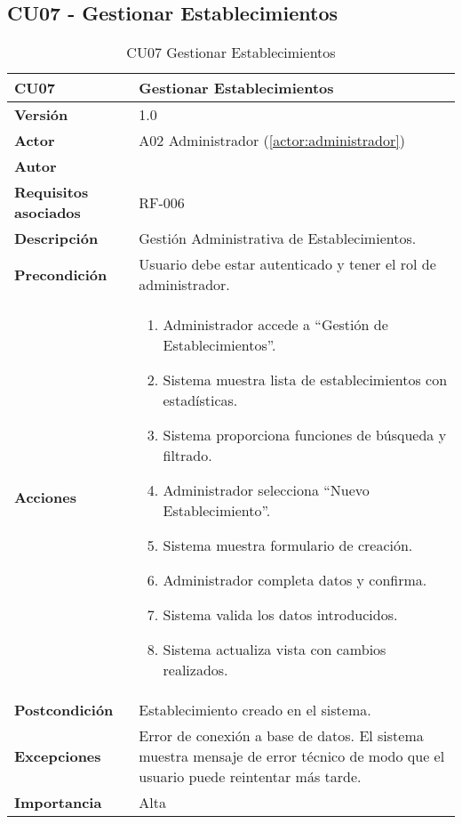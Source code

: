 \subsection{CU07 - Gestionar Establecimientos}

\begin{table}[H]
	\centering
	\begin{tabularx}{\linewidth}{ p{} p{} }
		\toprule
		\textbf{CU07}    & \textbf{Gestionar Establecimientos} \\
		\toprule
		\textbf{Versión}              & 1.0    \\
		\textbf{Actor}                & A02 Administrador (\ref{actor:administrador}) \\
		\textbf{Autor}                & \nombre \\
		\textbf{Requisitos asociados} & RF-006 \\
		\textbf{Descripción}          & Gestión Administrativa de Establecimientos. \\
		\textbf{Precondición}         & Usuario debe estar autenticado y tener el rol de administrador. \\
		\textbf{Acciones}             &
		\begin{enumerate}
			\def\labelenumi{\arabic{enumi}.}
			\tightlist
			\item Administrador accede a ``Gestión de Establecimientos''.
            \item Sistema muestra lista de establecimientos con estadísticas.
            \item Sistema proporciona funciones de búsqueda y filtrado.
            \item Administrador selecciona ``Nuevo Establecimiento''.
 	    \item Sistema muestra formulario de creación.
            \item Administrador completa datos y confirma.
            \item Sistema valida los datos introducidos.
            \item Sistema actualiza vista con cambios realizados.
		\end{enumerate}\\
		\textbf{Postcondición}        & Establecimiento creado en el sistema.\\
		\textbf{Excepciones}          & Error de conexión a base de datos. El sistema muestra mensaje de error técnico de modo que el usuario puede reintentar más tarde.\\
		\textbf{Importancia}          & Alta \\
		\bottomrule
	\end{tabularx}
	\caption{CU07 Gestionar Establecimientos}
	\label{cu:gestionar-establecimientos}
\end{table}

